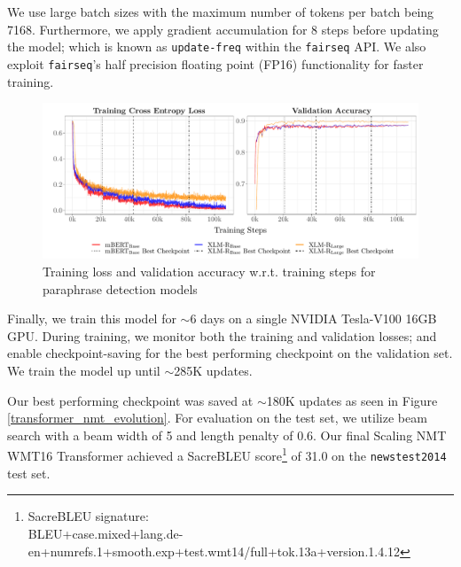 \documentclass[11pt,a4paper]{article}
\begin{document}
We use large batch sizes with the maximum number of tokens per batch being 7168. Furthermore, we apply gradient accumulation for 8 steps before updating the model; which is known as \texttt{update-freq} within the \texttt{fairseq} API. We also exploit \texttt{fairseq}'s half precision floating point (FP16) functionality for faster training.

\begin{figure}
  \centering 
  \includegraphics[trim={0.7cm 0cm 0cm 0cm},clip,width=\textwidth]{paraphrase_detection_models_evolution.pdf}
  \caption{Training loss and validation accuracy w.r.t. training steps for paraphrase detection models}
  \label{paraphrase_detection_model_evolution}
\end{figure}

Finally, we train this model for $\sim$6 days on a single NVIDIA Tesla-V100 16GB GPU. During training, we monitor both the training and validation losses; and enable checkpoint-saving for the best performing checkpoint on the validation set. We train the model up until $\sim$285K updates.

Our best performing checkpoint was saved at $\sim$180K updates as seen in Figure \ref{transformer_nmt_evolution}. For evaluation on the test set, we utilize beam search with a beam width of 5 and length penalty of 0.6. Our final Scaling NMT WMT16 Transformer achieved a SacreBLEU score\footnote{SacreBLEU signature:\\BLEU+case.mixed+lang.de-en+numrefs.1+smooth.exp+test.wmt14/full+tok.13a+version.1.4.12} of 31.0 on the \texttt{newstest2014} test set.


\end{document}
